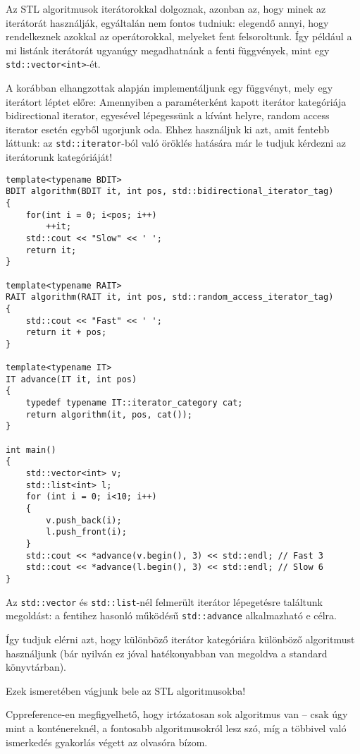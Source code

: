\documentclass[a4paper,11.5pt,table]{article}
\begin{document}
	Az STL algoritmusok iterátorokkal dolgoznak, azonban az, hogy minek az iterátorát használják, egyáltalán nem fontos tudniuk: elegendő annyi, hogy rendelkeznek azokkal az operátorokkal, melyeket fent felsoroltunk. Így például a mi listánk iterátorát ugyanúgy megadhatnánk a fenti függvények, mint egy \texttt{std::vector<int>}-ét.
	
	\medskip
	A korábban elhangzottak alapján implementáljunk egy függvényt, mely egy iterátort léptet előre: Amennyiben a paraméterként kapott iterátor kategóriája bidirectional iterator, egyesével lépegessünk a kívánt helyre, random access iterator esetén egyből ugorjunk oda.  Ehhez használjuk ki azt, amit fentebb láttunk: az \texttt{std::iterator}-ból való öröklés hatására már le tudjuk kérdezni az iterátorunk kategóriáját!
	\begin{lstlisting}
template<typename BDIT> 
BDIT algorithm(BDIT it, int pos, std::bidirectional_iterator_tag) 
{
	for(int i = 0; i<pos; i++)
		++it;
	std::cout << "Slow" << ' ';
	return it;
}

template<typename RAIT>
RAIT algorithm(RAIT it, int pos, std::random_access_iterator_tag) 
{
	std::cout << "Fast" << ' ';
	return it + pos;
}

template<typename IT> 
IT advance(IT it, int pos) 
{
	typedef typename IT::iterator_category cat;
	return algorithm(it, pos, cat());
}

int main() 
{
	std::vector<int> v;
	std::list<int> l;
	for (int i = 0; i<10; i++)
	{
		v.push_back(i);
		l.push_front(i);
	}
	std::cout << *advance(v.begin(), 3) << std::endl; // Fast 3
	std::cout << *advance(l.begin(), 3) << std::endl; // Slow 6
}  
	\end{lstlisting}
	\begin{note}
		Az \texttt{std::vector} és \texttt{std::list}-nél felmerült iterátor lépegetésre találtunk megoldást: a fentihez hasonló működésű \texttt{std::advance} alkalmazható e célra.
	\end{note}
	Így tudjuk elérni azt, hogy különböző iterátor kategóriára különböző algoritmust használjunk (bár nyilván ez jóval hatékonyabban van megoldva a standard könyvtárban).
	\medskip
	
	Ezek ismeretében vágjunk bele az STL algoritmusokba!
	\begin{note}
		Cppreference-en megfigyelhető, hogy irtózatosan sok algoritmus van -- csak úgy mint a konténereknél, a fontosabb algoritmusokról lesz szó, míg a többivel való ismerkedés gyakorlás végett az olvasóra bízom.
	\end{note}
\end{document}
